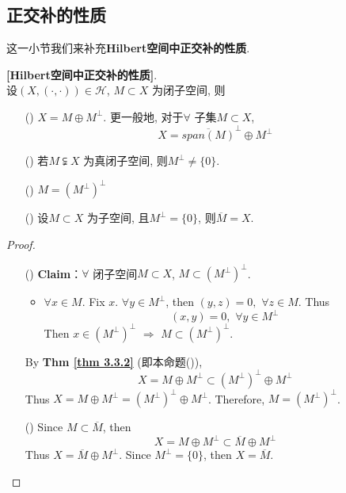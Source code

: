 \newpage

\subsection{正交补的性质}
	这一小节我们来补充\textbf{Hilbert空间中正交补的性质}. 
	
	\vspace{1em}
	
	\begin{proposition}\label{prop 3.3.2}
		\textbf{[Hilbert空间中正交补的性质]}. \\
		设$(X , (\cdot , \cdot)) \in \mathcal{H}$, $M \subset X$ 为闭子空间, 则
		
		\vspace{1em}
		
		\begin{enumerate}
			\item[(\rmnum{1})] $X = M \oplus M^{\perp}$. 更一般地, 对于$\forall$ 子集$M \subset X$, 
			\[ X = \overline{span(M)}^{\perp} \oplus M^{\perp} \]
			
			\item[(\rmnum{2})] 若$M \subsetneqq X$ 为真闭子空间, 则$M^{\perp} \neq \{ 0 \}$. 
			
			\item[(\rmnum{3})] $M = \left( M^{\perp} \right)^{\perp}$ 
			
			\item[(\rmnum{4})] 设$M \subset X$ 为子空间, 且$M^{\perp} = \{ 0 \}$, 则$\overline{M} = X$. 
		\end{enumerate}
		
		\vspace{6em}
		
		\begin{proof}
			\begin{enumerate}
				\item[(\rmnum{3})] \textbf{Claim}：$\forall$ 闭子空间$M \subset X$, $M \subset \left( M^{\perp} \right)^{\perp}$. 
				\begin{itemize}
					\item $\forall x \in M$. Fix $x$. $\forall y \in M^{\perp}$, then $(y , z) = 0 , \,\, \forall z \in M$. Thus
					\[ (x , y) = 0 , \,\, \forall y \in M^{\perp} \]
					Then $x \in \left( M^{\perp} \right)^{\perp} \,\, \Rightarrow \,\, M \subset \left( M^{\perp} \right)^{\perp}$. 
				\end{itemize}
				By \textbf{Thm \ref{thm 3.3.2}} (即本命题()), 
				\[ X = M \oplus M^{\perp} \subset \left( M^{\perp} \right)^{\perp} \oplus M^{\perp} \]
				Thus $X = M \oplus M^{\perp} = \left( M^{\perp} \right)^{\perp} \oplus M^{\perp}$. Therefore, $M = \left( M^{\perp} \right)^{\perp}$. 
				
				\vspace{5em}
				
				\item[(\rmnum{4})] Since $M \subset \overline{M}$, then 
				\[ X = M \oplus M^{\perp} \subset \overline{M} \oplus M^{\perp} \]
				Thus $X = \overline{M} \oplus M^{\perp}$. Since $M^{\perp} = \{ 0 \}$, then $X = \overline{M}$.
			\end{enumerate}
		\end{proof}
	\end{proposition}
